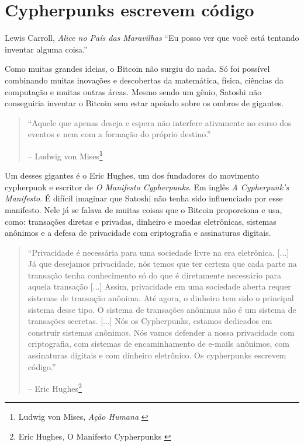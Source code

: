 \chapter{Cypherpunks escrevem código}
\label{les:20}

\begin{chapquote}{Lewis Carroll, \textit{Alice no País das Maravilhas}}
\enquote{Eu posso ver que você está tentando inventar alguma coisa.}
\end{chapquote}

Como muitas grandes ideias, o Bitcoin não surgiu do nada.
Só foi possível combinando muitas inovações e descobertas da matemática, 
física, ciências da computação e muitas outras áreas. Mesmo sendo um gênio, 
Satoshi não conseguiria inventar o Bitcoin sem estar apoiado sobre os ombros de gigantes.

\begin{quotation}\begin{samepage}
\enquote{Aquele que apenas deseja e espera não interfere ativamente no curso dos eventos e nem com a formação do próprio destino.}
\begin{flushright} -- Ludwig von Mises\footnote{Ludwig von Mises, \textit{Ação Humana} \cite{human-action}}
\end{flushright}\end{samepage}\end{quotation}

Um desses gigantes é o Eric Hughes, um dos fundadores do movimento cypherpunk
e escritor de \textit{O Manifesto Cypherpunks}. Em inglês \textit{A Cypherpunk's Manifesto}. 
É difícil imaginar que Satoshi não tenha sido influenciado por esse manifesto. Nele já se falava de muitas coisas que o Bitcoin proporciona e usa, como: transações diretas e privadas, dinheiro e moedas eletrônicas, sistemas anônimos e a defesa de privacidade com criptografia e assinaturas digitais.

\begin{quotation}\begin{samepage}
\enquote{Privacidade é necessária para uma sociedade livre na era eletrônica.
	[...] Já que desejamos privacidade, nós temos que ter certeza que cada parte 
	na transação tenha conhecimento só do que é diretamente necessário para 
	aquela transação [...]
	Assim, privacidade em uma sociedade aberta requer sistemas de transação anônima. 
	Até agora, o dinheiro tem sido o principal sistema desse tipo.
	O sistema de transações anônimas não é um sistema de transações secretas. [...]
	Nós os Cypherpunks, estamos dedicados em construir sistemas anônimos. Nós vamos 
	defender a nossa privacidade com criptografia, com sistemas de encaminhamento 
	de e-mails anônimos, com assinaturas digitais e com dinheiro eletrônico. 
	Os cypherpunks escrevem código.}

\begin{flushright} -- Eric Hughes\footnote{Eric Hughes, O Manifesto Cypherpunks \cite{cypherpunk-manifesto}}
\end{flushright}\end{samepage}\end{quotation}

